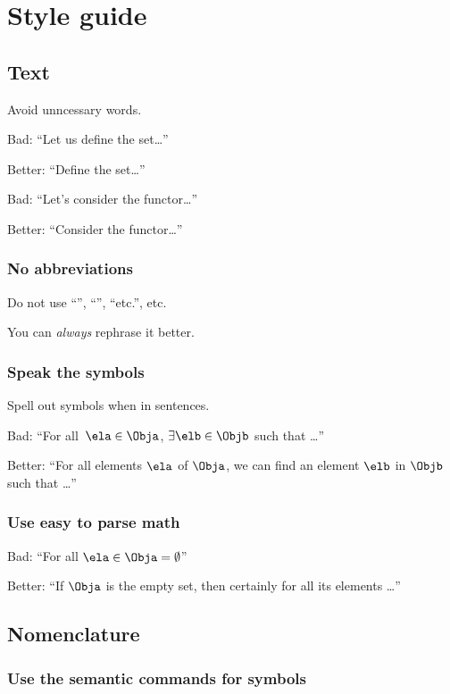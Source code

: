 
\section{Style guide}
\subsection*{Text}

Avoid unncessary words.

Bad: ``Let us define the set\dots''

Better: ``Define the set\dots''

Bad: ``Let's consider the functor\dots''

Better: ``Consider the functor\dots ''

\subsubsection*{No abbreviations}
Do not use ``\ie '', ``\eg '', ``etc.'', etc.

You can \emph{always} rephrase it better.

\subsubsection*{Speak the symbols}
Spell out symbols when in sentences.

Bad: ``For all~$\ela \in \Obja$, $\exists \elb \in \Objb$ such that \dots''

Better: ``For all elements $\ela$ of $\Obja$, we can find an element $\elb$ in $\Objb$ such that \dots''

\subsubsection*{Use easy to parse math}

Bad: ``For all $\ela\in \Obja=\emptyset$''

Better: ``If $\Obja$ is the empty set, then certainly for all its elements \dots''

\subsection*{Nomenclature}

\subsubsection*{Use the semantic commands for symbols}


